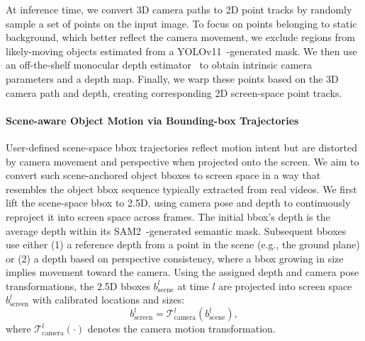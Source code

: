 At inference time, we convert 3D camera paths to 2D point tracks by randomly sample a set of points on the input image. To focus on points belonging to static background, which better reflect the camera movement, we exclude regions from likely-moving objects estimated from a YOLOv11~\cite{khanam2024yolov11}-generated mask. 
We then use an off-the-shelf monocular depth estimator~\cite{wang2024moge} to obtain intrinsic camera parameters and a depth map. Finally, we warp these points based on the 3D camera path and depth, creating corresponding 2D screen-space point tracks.

\paragraph{\textbf{Scene-aware Object Motion via Bounding-box Trajectories}}
User-defined scene-space bbox trajectories reflect motion intent but are distorted by camera movement and perspective when projected onto the screen. 
We aim to convert such scene-anchored object bboxes to screen space in a way that resembles the object bbox sequence typically extracted from real videos. 
We first lift the scene-space bbox to 2.5D, using camera pose and depth to continuously reproject it into screen space across frames. The initial bbox's depth is the average depth within its SAM2~\cite{ravi2024sam}-generated semantic mask. Subsequent bboxes use either (1) a reference depth from a point in the scene (e.g., the ground plane) or (2) a depth based on perspective consistency, where a bbox growing in size implies movement toward the camera.
Using the assigned depth and camera pose transformations, the 2.5D bboxes $b_\text{scene}^l$ at time $l$ are projected into screen space $b_\text{screen}^l$ with calibrated locations and sizes:
\begin{equation}
    b_\text{screen}^l = \mathcal{T}_\text{camera}^l(b_\text{scene}^l),
\end{equation}
where $\mathcal{T}_\text{camera}^l(\cdot)$ denotes the camera motion transformation.


